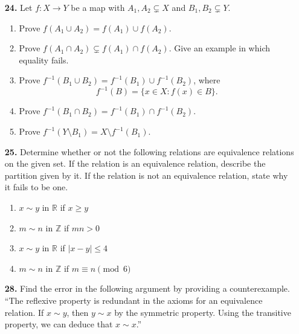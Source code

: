 \documentclass[12pt,reqno]{amsart}
\renewcommand{\subset}{\ensuremath{\subsetneq}}
\begin{document}
\begin{enumerate}[{\bf 1.}]
\medskip

\item[{\bf 24.}]
Let $f: X \rightarrow Y$ be a map with $A_1, A_2 \subset X$ and $B_1, B_2 \subset Y$. 
\begin{enumerate}
 
\item
Prove $f( A_1 \cup A_2 ) = f( A_1) \cup f( A_2 )$.
 
\item
Prove $f( A_1 \cap A_2 ) \subset f( A_1) \cap f( A_2 )$.  Give an example in which equality fails.
 
\item
Prove $f^{-1}( B_1 \cup B_2 ) = f^{-1}( B_1) \cup f^{-1}(B_2 )$, where
\[
f^{-1}(B) = \{ x \in X : f(x) \in B \}.
\]
 
\item
Prove $f^{-1}( B_1 \cap B_2 ) = f^{-1}( B_1) \cap f^{-1}( B_2 )$. 
 
\item
Prove $f^{-1}( Y \setminus B_1 ) = X \setminus f^{-1}( B_1)$.
 
\end{enumerate}

\medskip

\item[{\bf 25.}]
Determine whether or not the following relations are equivalence relations on the given set.  If the relation is an equivalence relation, describe the partition given by it.  If the relation is not an equivalence relation, state why it fails to be one.
\begin{multicols}{2}
\begin{enumerate}
 
\item
$x \sim y$ in ${\mathbb R}$ if $x \geq y$
 
\item
$m \sim n$ in ${\mathbb Z}$ if $mn > 0$
 
\item
$x \sim y$ in ${\mathbb R}$ if $|x - y| \leq 4$
 
\item
$m \sim n$ in ${\mathbb Z}$ if $m \equiv n \pmod{6}$
 
\end{enumerate}
\end{multicols}
 
\medskip

 
\item[{\bf 28.}]
Find the error in the following argument by providing a counterexample. ``The
reflexive property is redundant in the axioms for an equivalence relation.  If
$x \sim y$, then $y \sim x$ by the symmetric property.  Using the transitive
property, we can deduce that $x \sim x$.''
 
\end{enumerate}
\end{document}
